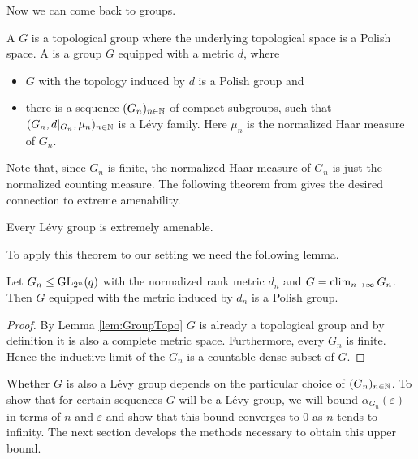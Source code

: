 Now we can come back to groups.
\begin{definition}
A  $G$ is a topological group where the underlying topological space is a Polish space. A  is a group $G$ equipped with a metric $d$, where
\begin{itemize}
\item $G$ with the topology induced by $d$ is a Polish group and
\item there is a sequence $(G_n)_{n\in\mathbb{N}}$ of compact subgroups, such that $(G_n,d|_{G_n},\mu_n)_{n\in\mathbb{N}}$ is a L\'evy family. Here $\mu_n$ is the normalized Haar measure of $G_n$.
\end{itemize}  
\end{definition}
Note that, since $G_n$ is finite, the normalized Haar measure of $G_n$ is just the normalized counting measure.
The following theorem from \cite[Theorem \textbf{4.1.3}]{Levy} %
gives the desired connection to extreme amenability.
\begin{theorem}\label{thm:LevyImpliesExAm}
Every L\'evy group is extremely amenable.
\end{theorem}

To apply this theorem to our setting we need the following lemma.
\begin{lemma}
Let $G_n\leq\operatorname{GL}_{2^n}(q)$ with the normalized rank metric $d_n$ and $G=\operatorname{clim}\limits_{n\to\infty} G_n$. Then $G$ equipped with the metric induced by $d_n$ is a Polish group. 
\end{lemma}
\begin{proof}
By Lemma \ref{lem:GroupTopo} $G$ is already a topological group and by definition it is also a complete metric space. Furthermore, every $G_n$ is finite. Hence the inductive limit of the $G_n$ is a countable dense subset of $G$.
\end{proof}

Whether $G$ is also a L\'evy group depends on the particular choice of $(G_n)_{n\in\mathbb{N}}$. 
To show that for certain sequences $G$ will be a L\'evy group, we will bound $\alpha_{G_n}(\varepsilon)$ in terms of $n$ and $\varepsilon$ and show that this bound converges to 0 as $n$ tends to infinity. 
The next section develops the methods necessary to obtain this upper bound.

